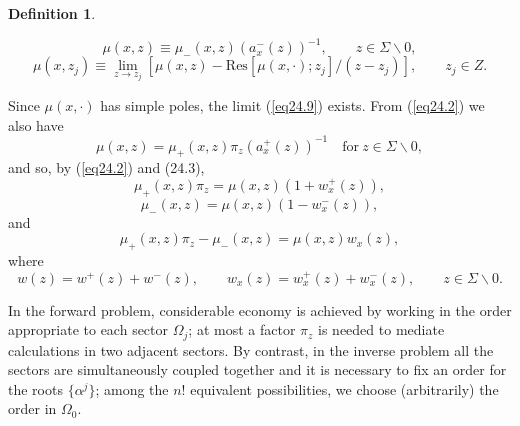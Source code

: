 \documentclass{surv-l}
\theoremstyle{plain}
\theoremstyle{definition}
\newtheorem{definition}[theorem]{Definition}
\numberwithin{equation}{chapter}
\begin{document}
\begin{definition}\label{defi24.7}

\renewcommand{\theequation}{\thesection.\arabic{equation}}
\setcounter{section}{24}
\setcounter{equation}{7}
\begin{equation}\label{eq24.8}
\mu(x, z)\equiv\mu_{-}(x,z)(a_{x}^{-}(z))^{-1},\qquad z\in\Sigma\backslash 0,
\end{equation}
\begin{equation}\label{eq24.9}
\mu(x, z_{j})\equiv\lim_{z\rightarrow z_{j}}[\mu(x,z)-\mathrm{Res}[\mu(x, \cdot);z_{j}]/(z-z_{j})],\qquad z_{j}\in  Z.
\end{equation}

Since $\mu(x, \cdot)$ has simple poles, the limit (\ref{eq24.9}) exists. From (\ref{eq24.2}) we also have
\begin{equation}\label{eq24.10}
\mu(x, z)=\mu_{+}(x, z)\pi_{z}(a_{x}^{+}(z))^{-1}\quad \mathrm{for}\ z\in\Sigma\backslash 0,
\end{equation}
and so, by (\ref{eq24.2}) and (24.3),
\setcounter{equation}{10}
\begin{equation}\label{eq24.11}
\mu_{+}(x, z)\pi_{z} = \mu(x, z)(1+w_{x}^{+}(z)),
\end{equation}
\begin{equation}\label{eq24.12}
\mu_{-}(x, z) = \mu(x, z)(1-w_{x}^{-}(z)),
\end{equation}
and
\begin{equation}\label{eq24.13}
\mu_{+}(x,z)\pi_{z}-\mu_{-}(x, z)=\mu(x, z)w_{x}(z),
\end{equation}
where
\begin{equation}\label{eq24.14}
w(z)=w^{+}(z)+w^{-}(z),\qquad w_{x}(z)=w_{x}^{+}(z)+w_{x}^{-}(z),\qquad z\in\Sigma\backslash 0.
\end{equation}

In the forward problem, considerable economy is achieved by working in the order appropriate to each sector $\Omega_{j}$; at most a factor $\pi_{z}$ is needed to mediate calculations in two adjacent sectors. By contrast, in the inverse problem all the sectors are simultaneously coupled together and it is necessary to fix an order for the roots $\{\alpha^{j}\}$; among the $n!$ equivalent possibilities, we choose (arbitrarily) the order in $\Omega_{0}$.
\end{definition}
\setcounter{theorem}{14}
\end{document}
